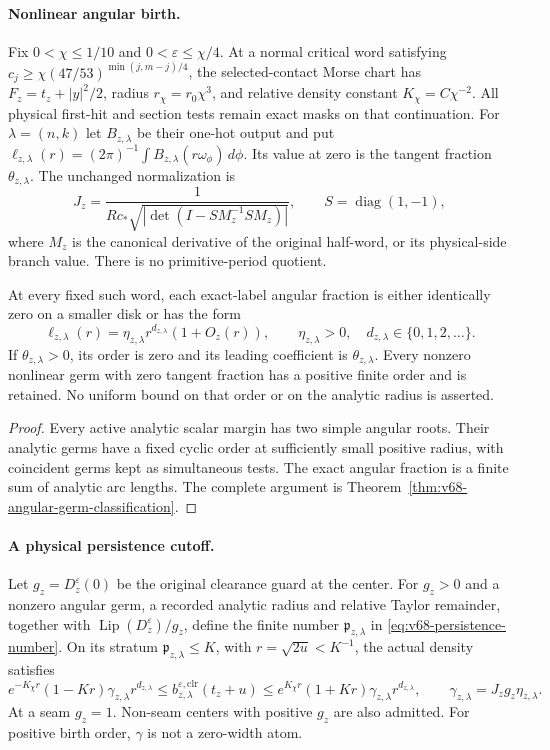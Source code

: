 \paragraph{Nonlinear angular birth.}
Fix $0<\chi\le1/10$ and $0<\varepsilon\le\chi/4$. At a normal
critical word satisfying
$c_j\ge\chi(47/53)^{\min(j,m-j)/4}$, the selected-contact Morse
chart has $F_z=t_z+|y|^2/2$, radius $r_\chi=r_0\chi^3$, and
relative density constant $K_\chi=C\chi^{-2}$. All physical
first-hit and section tests remain exact masks on that continuation.
For $\lambda=(n,k)$ let $B_{z,\lambda}$ be their one-hot output and
put $\ell_{z,\lambda}(r)=(2\pi)^{-1}\int B_{z,\lambda}(r\omega_\phi)\,d\phi$.
Its value at zero is the tangent fraction $\theta_{z,\lambda}$.
The unchanged normalization is
\[
 J_z=\frac1{Rc_*\sqrt{|\det(I-SM_z^{-1}SM_z)|}},
 \qquad S=\operatorname{diag}(1,-1),
\]
where $M_z$ is the canonical derivative of the original half-word,
or its physical-side branch value. There is no primitive-period quotient.

\begin{leadtheorem}
\label{thm:intro-v68-germs}
At every fixed such word, each exact-label angular fraction is either
identically zero on a smaller disk or has the form
\[
 \ell_{z,\lambda}(r)=\eta_{z,\lambda}r^{d_{z,\lambda}}
                         (1+O_z(r)),\qquad
 \eta_{z,\lambda}>0,\quad d_{z,\lambda}\in\{0,1,2,\ldots\}.
\]
If $\theta_{z,\lambda}>0$, its order is zero and its leading
coefficient is $\theta_{z,\lambda}$. Every nonzero nonlinear germ
with zero tangent fraction has a positive finite order and is retained.
No uniform bound on that order or on the analytic radius is asserted.
\end{leadtheorem}
\begin{proof}
Every active analytic scalar margin has two simple angular roots.
Their analytic germs have a fixed cyclic order at sufficiently small
positive radius, with coincident germs kept as simultaneous tests.
The exact angular fraction is a finite sum of analytic arc lengths.
The complete argument is Theorem~\ref{thm:v68-angular-germ-classification}.
\end{proof}

\paragraph{A physical persistence cutoff.}
Let $g_z=D_z^\varepsilon(0)$ be the original clearance guard at the
center. For $g_z>0$ and a nonzero angular germ, a recorded analytic
radius and relative Taylor remainder, together with
$\operatorname{Lip}(D_z^\varepsilon)/g_z$, define the finite number
$\mathfrak p_{z,\lambda}$ in \eqref{eq:v68-persistence-number}.
On its stratum $\mathfrak p_{z,\lambda}\le K$, with
$r=\sqrt{2u}<K^{-1}$, the actual density satisfies
\[
 e^{-K_\chi r}(1-Kr)\gamma_{z,\lambda}r^{d_{z,\lambda}}
 \le b_{z,\lambda}^{\varepsilon,\mathrm{clr}}(t_z+u)
 \le e^{K_\chi r}(1+Kr)\gamma_{z,\lambda}r^{d_{z,\lambda}},
 \qquad \gamma_{z,\lambda}=J_zg_z\eta_{z,\lambda}.
\]
At a seam $g_z=1$. Non-seam centers with positive $g_z$ are also
admitted. For positive birth order, $\gamma$ is not a zero-width atom.

